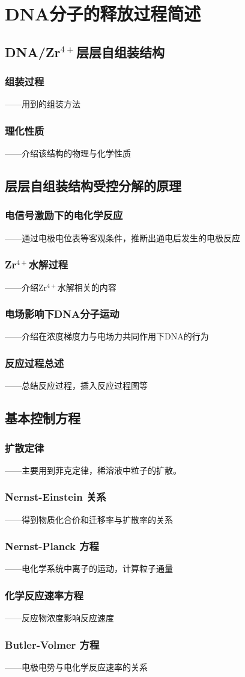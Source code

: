 \chapter{DNA分子的释放过程简述}
\section{DNA/Zr$^{4+}$层层自组装结构}
\subsection{组装过程}
——用到的组装方法
\subsection{理化性质}
——介绍该结构的物理与化学性质
\section{层层自组装结构受控分解的原理}
\subsection{电信号激励下的电化学反应}
——通过电极电位表等客观条件，推断出通电后发生的电极反应
\subsection{Zr$^{4+}$水解过程}
——介绍Zr$^{4+}$水解相关的内容
\subsection{电场影响下DNA分子运动}
——介绍在浓度梯度力与电场力共同作用下DNA的行为
\subsection{反应过程总述}
——总结反应过程，插入反应过程图等
\section{基本控制方程}
\subsection{扩散定律}
——主要用到菲克定律，稀溶液中粒子的扩散。
\subsection{Nernst-Einstein 关系}
——得到物质化合价和迁移率与扩散率的关系\parencite{Ferrari1985}
\subsection{Nernst-Planck 方程}
——电化学系统中离子的运动，计算粒子通量
\subsection{化学反应速率方程}
——反应物浓度影响反应速度
\subsection{Butler-Volmer 方程}
——电极电势与电化学反应速率的关系


